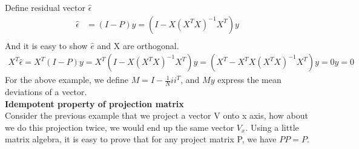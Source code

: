 \documentclass[a4paper]{article}
\begin{document}
Define residual vector $\hat \epsilon$
\begin{align*}
\hat \epsilon & = (I - P) y = (I - X(X^TX)^{-1}X^T)y\\
\end{align*}
And it is easy to show $\hat e$ and X are orthogonal.
\begin{align*}
X^T \hat \epsilon = X^T (I-P)y =X^T(I - X(X^TX)^{-1}X^T)y = (X^T- X^TX(X^TX)^{-1}X^T)y = 0 y = 0
\end{align*}
For the above example, we define $M = I - \frac{1}{N}i i^T$, and $My$ express the mean deviations of a vector.\\
{\bf Idempotent property of projection matrix\\}
Consider the previous example that we project a vector V onto x axis, how about we do this projection twice, we would end up the same vector $V_x$. Using a little matrix algebra, it is easy to prove that for any project matrix P, we have $PP=P$.  
\end{document}
